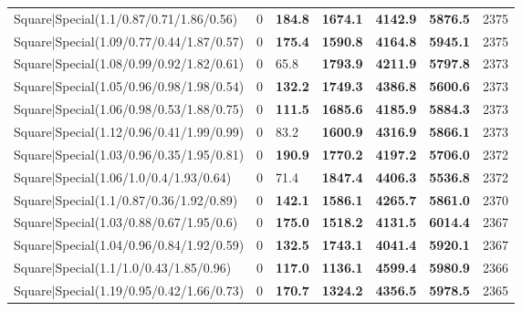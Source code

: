 \begin{tabular}{lrllllr}
 Square|Special(1.1/0.87/0.71/1.86/0.56)                       &             0   & \textbf{184.8} & \textbf{1674.1} & \textbf{4142.9} & \textbf{5876.5} &         2375 \\
 Square|Special(1.09/0.77/0.44/1.87/0.57)                      &             0   & \textbf{175.4} & \textbf{1590.8} & \textbf{4164.8} & \textbf{5945.1} &         2375 \\
 Square|Special(1.08/0.99/0.92/1.82/0.61)                      &             0   & 65.8           & \textbf{1793.9} & \textbf{4211.9} & \textbf{5797.8} &         2373 \\
 Square|Special(1.05/0.96/0.98/1.98/0.54)                      &             0   & \textbf{132.2} & \textbf{1749.3} & \textbf{4386.8} & \textbf{5600.6} &         2373 \\
 Square|Special(1.06/0.98/0.53/1.88/0.75)                      &             0   & \textbf{111.5} & \textbf{1685.6} & \textbf{4185.9} & \textbf{5884.3} &         2373 \\
 Square|Special(1.12/0.96/0.41/1.99/0.99)                      &             0   & 83.2           & \textbf{1600.9} & \textbf{4316.9} & \textbf{5866.1} &         2373 \\
 Square|Special(1.03/0.96/0.35/1.95/0.81)                      &             0   & \textbf{190.9} & \textbf{1770.2} & \textbf{4197.2} & \textbf{5706.0} &         2372 \\
 Square|Special(1.06/1.0/0.4/1.93/0.64)                        &             0   & 71.4           & \textbf{1847.4} & \textbf{4406.3} & \textbf{5536.8} &         2372 \\
 Square|Special(1.1/0.87/0.36/1.92/0.89)                       &             0   & \textbf{142.1} & \textbf{1586.1} & \textbf{4265.7} & \textbf{5861.0} &         2370 \\
 Square|Special(1.03/0.88/0.67/1.95/0.6)                       &             0   & \textbf{175.0} & \textbf{1518.2} & \textbf{4131.5} & \textbf{6014.4} &         2367 \\
 Square|Special(1.04/0.96/0.84/1.92/0.59)                      &             0   & \textbf{132.5} & \textbf{1743.1} & \textbf{4041.4} & \textbf{5920.1} &         2367 \\
 Square|Special(1.1/1.0/0.43/1.85/0.96)                        &             0   & \textbf{117.0} & \textbf{1136.1} & \textbf{4599.4} & \textbf{5980.9} &         2366 \\
 Square|Special(1.19/0.95/0.42/1.66/0.73)                      &             0   & \textbf{170.7} & \textbf{1324.2} & \textbf{4356.5} & \textbf{5978.5} &         2365 \\

\end{tabular}
